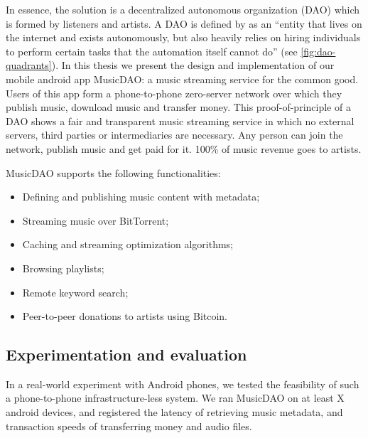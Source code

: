 In essence, the solution is a decentralized autonomous organization (DAO) which is formed by listeners and artists. A DAO is defined by \cite{buterin2014dao} as an ``entity that lives on the internet and exists autonomously, but also heavily relies on hiring individuals to perform certain tasks that the automation itself cannot do'' (see \ref{fig:dao-quadrants}). In this thesis we present the design and implementation of our mobile android app MusicDAO: a music streaming service for the common good. Users of this app form a phone-to-phone zero-server network over which they publish music, download music and transfer money. This proof-of-principle of a DAO shows a fair and transparent music streaming service in which no external servers, third parties or intermediaries are necessary. Any person can join the network, publish music and get paid for it. 100\% of music revenue goes to artists.

MusicDAO supports the following functionalities:
\begin{itemize}
    \item Defining and publishing music content with metadata;
    \item Streaming music over BitTorrent;
    \item Caching and streaming optimization algorithms;
    \item Browsing playlists;
    \item Remote keyword search;
    \item Peer-to-peer donations to artists using Bitcoin.
\end{itemize}

\subsection{Experimentation and evaluation}
In a real-world experiment with Android phones, we tested the feasibility of such a phone-to-phone infrastructure-less system. We ran MusicDAO on at least X android devices, and registered the latency of retrieving music metadata, and transaction speeds of transferring money and audio files. 

